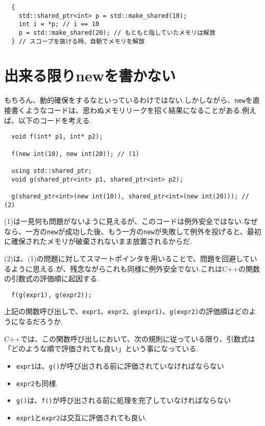 \documentclass[a4j,11pt,openright]{jsbook}
\begin{document}
\begin{verbatim}
  {
    std::shared_ptr<int> p = std::make_shared(10);
    int i = *p; // i == 10
    p = std::make_shared(20); // もともと指していたメモリは解放
  } // スコープを抜ける時、自動でメモリを解放
\end{verbatim}

\section{出来る限りnewを書かない}

もちろん、動的確保をするなといっているわけではない.しかしながら、\verb|new|を直接書くようなコードは、思わぬメモリリークを招く結果になることがある.例えば、以下のコードを考える.

\begin{verbatim}
  void f(int* p1, int* p2);

  f(new int(10), new int(20)); // (1)

  using std::shared_ptr;
  void g(shared_ptr<int> p1, shared_ptr<int> p2);

  g(shared_ptr<int>(new int(10)), shared_ptr<int>(new int(20))); // (2)
\end{verbatim}

(1)は一見何も問題がないように見えるが、このコードは例外安全ではない.なぜなら、一方の\verb|new|が成功した後、もう一方の\verb|new|が失敗して例外を投げると、最初に確保されたメモリが破棄されないまま放置されるからだ.

(2)は、(1)の問題に対してスマートポインタを用いることで、問題を回避しているように思える.が、残念ながらこれも同様に例外安全でない.これはC++の関数の引数式の評価順に起因する.

\begin{verbatim}
  f(g(expr1), g(expr2));
\end{verbatim}

上記の関数呼び出しで、\verb|expr1|、\verb|expr2|、\verb|g(expr1)|、\verb|g(expr2)|の評価順はどのようになるだろうか.

C++では、この関数呼び出しにおいて、次の規則に従っている限り、引数式は「どのような順で評価されても良い」という事になっている.

\begin{itemize}
  \item \verb|expr1|は、\verb|g()|が呼び出される前に評価されていなければならない
  \item \verb|expr2|も同様.
  \item \verb|g()|は、\verb|f()|が呼び出される前に処理を完了していなければならない
  \item \verb|expr1|と\verb|expr2|は交互に評価されても良い.
\end{itemize}
\end{document}
